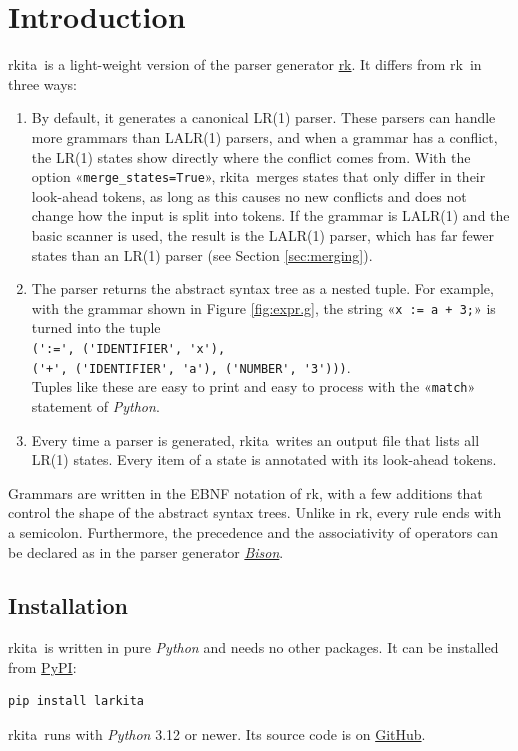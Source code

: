 \documentclass[11pt,a4paper]{article}
\makeatletter
\newcommand{\blue}[1]{{\color{blue}#1}}
\newcommand{\fakesc}[1]{\resizebox{!}{0.99ex}{\textls[90]{\MakeUppercase{#1}}}}
\def\@simtextsc#1#2\@nil{\MakeUppercase{#1}\fakesc{#2}}
\newcommand{\simtextsc}[1]{%
  \ifmmode\text{\@simtextsc#1\@nil}\else\@simtextsc#1\@nil\fi}
\newcommand{\Larkita}{\simtextsc{Larkita}}
\newcommand{\Lark}{\simtextsc{Lark}}
\newenvironment{unbreakable}{\par\noindent\begin{minipage}{\linewidth}}{\end{minipage}\par}
\makeatother
\begin{document}
\section{Introduction}
\Larkita\ is a light-weight version of the parser generator
\href{https://github.com/lark-parser/lark}{\Lark}.  It differs from \Lark\ in three ways:
\begin{enumerate}
\item By default, it generates a \blue{canonical LR(1) parser}.  These parsers can handle more grammars than
      LALR(1) parsers, and when a grammar has a conflict, the LR(1) states show directly where the conflict
      comes from.  With the option «\verb|merge_states=True|», \Larkita\ merges states that only differ in
      their look-ahead tokens, as long as this causes no new conflicts and does not change how the input is
      split into tokens.  If the grammar is LALR(1) and the basic scanner is used, the result is the LALR(1)
      parser, which has far fewer states than an LR(1) parser (see Section \ref{sec:merging}).
\item The parser returns the abstract syntax tree as a \blue{nested tuple}.  For example, with the grammar
      shown in Figure \ref{fig:expr.g}, the string «\verb|x := a + 3;|» is turned into the tuple
      \\[0.2cm]
      \hspace*{0.3cm}
      \verb|(':=', ('IDENTIFIER', 'x'),|
      \\
      \hspace*{2.0cm}
      \verb|('+', ('IDENTIFIER', 'a'), ('NUMBER', '3')))|.
      \\[0.2cm]
      Tuples like these are easy to print and easy to process with the «\verb|match|» statement of
      \textsl{Python}.
\item Every time a parser is generated, \Larkita\ writes an \blue{output file} that lists all LR(1) states.
      Every item of a state is annotated with its look-ahead tokens.
\end{enumerate}
Grammars are written in the EBNF notation of \Lark, with a few additions that control the shape of the
abstract syntax trees.  Unlike in \Lark, every rule ends with a semicolon.  Furthermore, the precedence and the associativity of operators can be declared as in
the parser generator \href{https://www.gnu.org/software/bison/}{\textsl{Bison}}.

\subsection{Installation}
\Larkita\ is written in pure \textsl{Python} and needs no other packages.  It can be installed from
\href{https://pypi.org/project/larkita/}{PyPI}:
\begin{unbreakable}
\begin{verbatim}
pip install larkita
\end{verbatim}
\end{unbreakable}
\Larkita\ runs with \textsl{Python} 3.12 or newer.  Its source code is on
\href{https://github.com/karlstroetmann/Larkita}{GitHub}.
\end{document}
